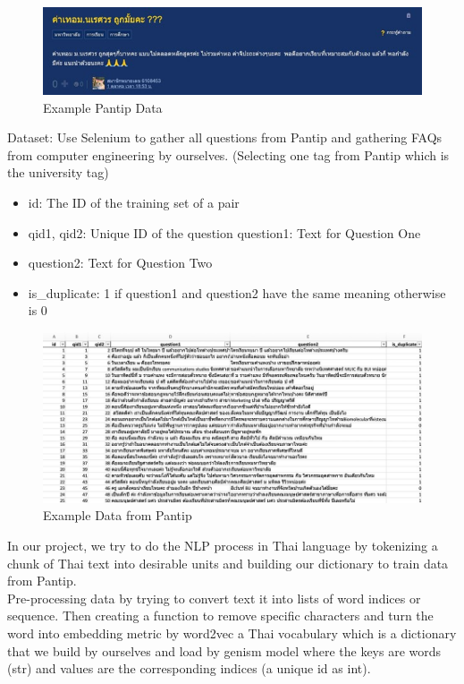 \documentclass[12pt,oneside,openright,a4paper]{cpe-english-project}
\begin{document}
\begin{figure}[!h]
	\includegraphics[width=14cm]{img/ch3/Example Pantip Data.jpg}
	\caption{Example Pantip Data}\label{fig:Example Pantip Data}
\end{figure}

\begin{flushleft}
Dataset: Use Selenium to gather all questions from Pantip and gathering FAQs from computer engineering by ourselves. (Selecting one tag from Pantip which is the university tag)
\end{flushleft}

\begin{itemize}
  \item id: The ID of the training set of a pair 
  \item qid1, qid2: Unique ID of the question question1: Text for Question One
  \item question2: Text for Question Two
  \item is\_duplicate: 1 if question1 and question2 have the same meaning otherwise is 0
\end{itemize}

\begin{figure}[!h]
	\includegraphics[width=14cm]{img/ch3/Example Data from Pantip.jpg}
	\caption{Example Data from Pantip}\label{fig:Example Data from Pantip}
\end{figure}

\begin{flushleft}
In our project, we try to do the NLP process in Thai language by tokenizing a chunk of Thai text into desirable units and building our dictionary to train data from Pantip.\\
\label{preprocessing cosine}
Pre-processing data by trying to convert text it into lists of word indices or sequence. Then creating a function to remove specific characters and turn the word into embedding metric by word2vec a Thai vocabulary which is a dictionary that we build by ourselves and load by genism model where the keys are words (str) and values are the corresponding indices (a unique id as int).
\end{flushleft}
\end{document}
